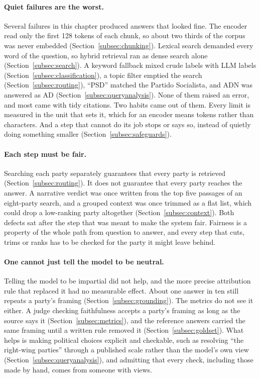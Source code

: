 \paragraph{Quiet failures are the worst.} Several failures in this chapter
produced answers that looked fine. The encoder read only the first 128 tokens
of each chunk, so about two thirds of the corpus was never embedded
(Section~\ref{subsec:chunking}). Lexical search demanded every word of the
question, so hybrid retrieval ran as dense search alone
(Section~\ref{subsec:search}). A keyword fallback mixed crude labels with LLM
labels (Section~\ref{subsec:classification}), a topic filter emptied the search
(Section~\ref{subsec:routing}), ``PSD'' matched the Partido Socialista, and ADN
was answered as AD (Section~\ref{subsec:queryanalysis}). None of them raised an
error, and most came with tidy citations. Two habits came out of them. Every
limit is measured in the unit that sets it, which for an encoder means tokens
rather than characters. And a step that cannot do its job stops or says so,
instead of quietly doing something smaller (Section~\ref{subsec:safeguards}).

\paragraph{Each step must be fair.} Searching each party
separately guarantees that every party is retrieved
(Section~\ref{subsec:routing}). It does not guarantee that every party reaches
the answer. A narrative verdict was once written from the top five passages of
an eight-party search, and a grouped context was once trimmed as a flat list,
which could drop a low-ranking party altogether
(Section~\ref{subsec:context}). Both defects sat after the step that was meant
to make the system fair. Fairness is a property of the whole path from
question to answer, and every step that cuts, trims or ranks has to be checked
for the party it might leave behind.

\paragraph{One cannot just tell the model to be neutral.} Telling the model to be
impartial did not help, and the more precise attribution rule that replaced
it had no measurable effect. About one answer in ten still repeats a party's
framing (Section~\ref{subsec:grounding}). The metrics do not see it either. A
judge checking faithfulness accepts a party's framing as long as the source
says it (Section~\ref{subsec:metrics}), and the reference answers carried the
same framing until a written rule removed it (Section~\ref{subsec:goldset}).
What helps is making political choices explicit and checkable, such as
resolving ``the right-wing parties'' through a published scale rather than the
model's own view (Section~\ref{subsec:queryanalysis}), and admitting that every
check, including those made by hand, comes from someone with views.

